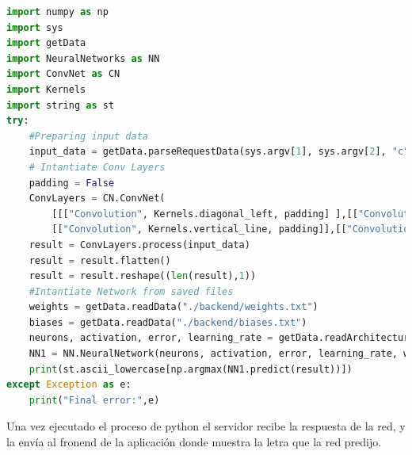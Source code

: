 \documentclass{article}
\begin{document}
\begin{lstlisting}[language=python]
import numpy as np 
import sys
import getData
import NeuralNetworks as NN
import ConvNet as CN
import Kernels
import string as st
try:
    #Preparing input data
    input_data = getData.parseRequestData(sys.argv[1], sys.argv[2], "c")
    # Intantiate Conv Layers
    padding = False
    ConvLayers = CN.ConvNet(
        [[["Convolution", Kernels.diagonal_left, padding] ],[["Convolution", Kernels.diagonal_right, padding]],
        [["Convolution", Kernels.vertical_line, padding]],[["Convolution", Kernels.horizontal_line, padding]]])     
    result = ConvLayers.process(input_data)
    result = result.flatten()
    result = result.reshape((len(result),1))
    #Intantiate Network from saved files
    weights = getData.readData("./backend/weights.txt")
    biases = getData.readData("./backend/biases.txt")
    neurons, activation, error, learning_rate = getData.readArchitecture("./backend/architecture.txt")
    NN1 = NN.NeuralNetwork(neurons, activation, error, learning_rate, weights=weights, biases=biases)
    print(st.ascii_lowercase[np.argmax(NN1.predict(result))])
except Exception as e:
    print("Final error:",e)
\end{lstlisting}
Una vez ejecutado el proceso de python el servidor recibe la respuesta de la red, y la envía al fronend de la aplicación donde muestra la letra que la red predijo.
\end{document}
